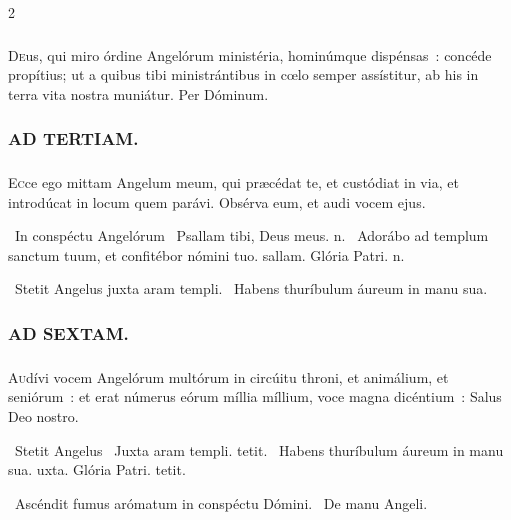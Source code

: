 \documentclass[9pt,twoside]{extarticle}
\begin{document}
\begin{multicols}{2}
{\subsubsection*{\center {}}
\lettrine{D}eus, qui miro órdine Angelórum ministéria, hominúmque dispénsas~: concéde propítius; ut a quibus tibi ministrántibus in cœlo semper assístitur, ab his in terra vita nostra muniátur. Per Dóminum.

\begin{tightlist}{}
\item {}
\end{tightlist}

\subsubsection*{\center \textsc{AD TERTIAM.}}
\subsubsection*{}
\lettrine{E}cce ego mittam Angelum meum, qui præcédat te, et custódiat in via, et introdúcat in locum quem parávi. Obsérva eum, et audi vocem ejus.

\begin{tightlist}{}
\item {}~In conspéctu Angelórum \textred{*}~Psallam tibi, Deus meus. n. ~Adorábo ad templum sanctum tuum, et confitébor nómini tuo. sallam. Glória Patri. n.
\item {}~Stetit Angelus juxta aram templi. ~Habens thuríbulum áureum in manu sua.
\end{tightlist}

\subsubsection*{\center \textsc{AD SEXTAM.}}
\subsubsection*{}
\lettrine{A}udívi vocem Angelórum multórum in circúitu throni, et animálium, et seniórum~: et erat númerus eórum míllia míllium, voce magna dicéntium~: Salus Deo nostro.

\begin{tightlist}{}
\item {}~Stetit Angelus \textred{*}~Juxta aram templi. tetit. ~Habens thuríbulum áureum in manu sua. uxta. Glória Patri. tetit.
\item {}~Ascéndit fumus arómatum in conspéctu Dómini. ~De manu Angeli.
\end{tightlist}

}
\end{multicols}
\end{document}
